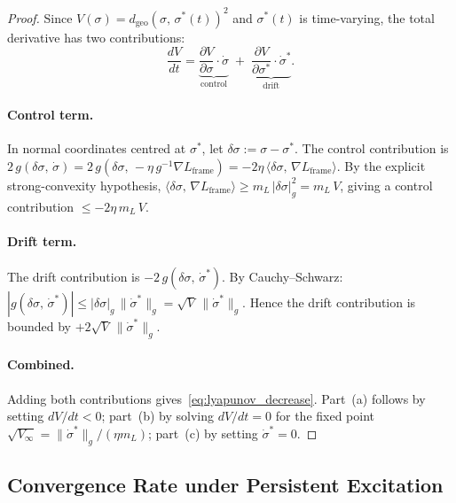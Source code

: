 \documentclass[12pt]{article}
\begin{document}
\begin{proof}
Since $V(\sigma) = d_{\mathrm{geo}}(\sigma,\,\sigma^*(t))^2$
and $\sigma^*(t)$ is time-varying, the total derivative
has two contributions:
\begin{equation*}
\frac{dV}{dt}
= \underbrace{\frac{\partial V}{\partial \sigma}
  \cdot \dot{\sigma}}_{\text{control}}
\;+\; \underbrace{\frac{\partial V}{\partial \sigma^*}
  \cdot \dot{\sigma}^*}_{\text{drift}}.
\end{equation*}

\paragraph{Control term.}
In normal coordinates centred at $\sigma^*$, let
$\delta\sigma := \sigma - \sigma^*$.
The control contribution is
$2\,g(\delta\sigma,\,\dot{\sigma})
= 2\,g(\delta\sigma,\,-\eta\,g^{-1}\nabla L_{\mathrm{frame}})
= -2\eta\,\langle \delta\sigma,\,
\nabla L_{\mathrm{frame}}\rangle$.
By the explicit strong-convexity hypothesis,
$\langle \delta\sigma,\,\nabla L_{\mathrm{frame}}\rangle
\geq m_L\,|\delta\sigma|_g^2 = m_L\,V$,
giving a control contribution $\leq -2\eta\,m_L\,V$.

\paragraph{Drift term.}
The drift contribution is
$-2\,g(\delta\sigma,\,\dot{\sigma}^*)$.
By Cauchy--Schwarz:
$|g(\delta\sigma,\,\dot{\sigma}^*)|
\leq |\delta\sigma|_g\,\|\dot{\sigma}^*\|_g
= \sqrt{V}\,\|\dot{\sigma}^*\|_g$.
Hence the drift contribution is bounded by
$+2\sqrt{V}\,\|\dot{\sigma}^*\|_g$.

\paragraph{Combined.}
Adding both contributions
gives~\eqref{eq:lyapunov_decrease}.
Part~(a) follows by setting
$dV/dt < 0$; part~(b) by solving $dV/dt = 0$ for
the fixed point $\sqrt{V_\infty}
= \|\dot{\sigma}^*\|_g/(\eta m_L)$;
part~(c) by setting $\dot{\sigma}^* = 0$.
\end{proof}

\subsection{Convergence Rate under Persistent Excitation}
\label{subsec:convergence}
\end{document}
